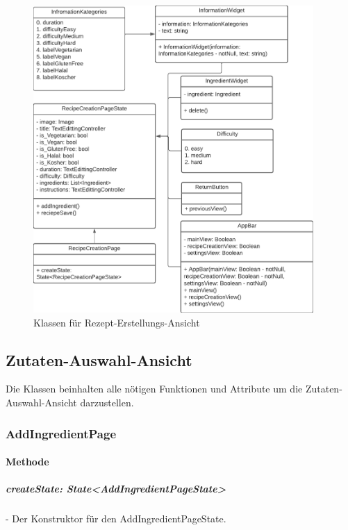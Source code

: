 \documentclass[parskip=full]{scrartcl}
\begin{document}
\begin{figure}[htp]
\begin{minipage}
                    \includegraphics[width=0.95\textwidth]{images/Presentation-layer/RecipeCreationViewClass.pdf}
                    \caption{Klassen für Rezept-Erstellungs-Ansicht}
                \end{minipage}
            \end{figure}

        \newpage

    \subsection{Zutaten-Auswahl-Ansicht}
        Die Klassen beinhalten alle nötigen Funktionen und Attribute um die Zutaten-Auswahl-Ansicht darzustellen.
    
        \subsubsection{AddIngredientPage}
            \paragraph*{Methode}
                \subparagraph*{createState: State<AddIngredientPageState>} - Der Konstruktor für den AddIngredientPageState.
        
\end{document}
